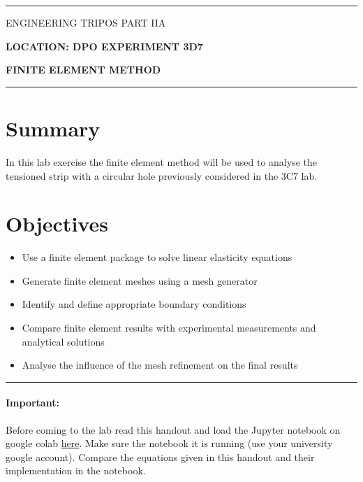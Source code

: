 \documentclass[11pt,a4paper]{article}
\begin{document}
\hrule\vspace{2mm} 
\centerline{\large   ENGINEERING TRIPOS PART IIA}
\vspace{0.5cm} \centerline{ \large \bfseries LOCATION: DPO  \hfill EXPERIMENT 3D7}
\vspace{0.5cm} \centerline{ \large \bfseries FINITE ELEMENT METHOD}
\vspace{2mm}
\hrule
%

%
\section*{Summary} 
%
In this lab exercise the finite element method will be used to analyse the tensioned strip with a circular hole previously considered in the 3C7 lab. 

%
\section*{Objectives} 
%
\begin{itemize}
\item Use a finite element package to solve linear elasticity equations

\item Generate finite element meshes using a mesh generator

\item Identify and define appropriate boundary conditions

\item Compare finite element results with experimental measurements and analytical solutions 

\item Analyse the influence of the mesh refinement on the final results
\end{itemize}

\vspace{0.5 cm} 
\hrule

\paragraph{Important:} Before coming to the lab read this handout and load the Jupyter notebook on google colab %
\href{https://colab.research.google.com/drive/1tYkNdpKFHEFJ1qunBwSKDfJbb1qeruqy?usp=sharing}{here}. Make sure the notebook it is running (use your university google account). Compare the equations given in this handout and their implementation in the notebook. 
\end{document}
